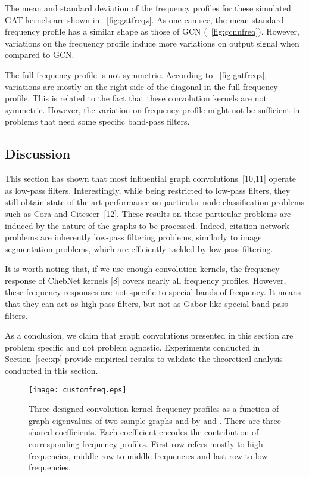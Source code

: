 \documentclass{article}
\begin{document}
The mean and standard deviation of the frequency profiles for these simulated GAT kernels are shown in \figurename~\ref{fig:gatfreqz}. As one can see, the mean standard frequency profile has a similar shape as those of GCN (\figurename~\ref{fig:gcnnfreq}). However, variations on the frequency profile induce more variations on output signal when compared to GCN.  

The full frequency profile is not symmetric. According to  \figurename~\ref{fig:gatfreqz}, variations are mostly on the right side of the diagonal in the full frequency profile. This is related to the fact that these convolution kernels are not symmetric. However, the variation on frequency profile might not be sufficient in problems that need some specific band-pass filters.  


\subsection*{Discussion}

This section has shown that most influential graph convolutions~[10,11] operate as low-pass filters. Interestingly, while being restricted to low-pass filters, they still obtain state-of-the-art performance on particular node classification problems such as Cora and Citeseer~[12]. These results  on these particular problems are induced by the nature of the graphs to be processed. Indeed, citation network problems are inherently low-pass filtering problems, similarly to image segmentation problems, which are efficiently tackled by low-pass filtering. 

It is worth noting that, if we use enough convolution kernels, the frequency response of ChebNet kernels [8] covers nearly all frequency profiles. However, these frequency responses are not specific to special bands of frequency. It means that they can act as high-pass filters, but not as  Gabor-like special band-pass filters.

As a conclusion, we claim that graph convolutions presented in this section are problem specific and not problem agnostic. Experiments conducted in Section~\ref{sec:xp} provide empirical results to validate the theoretical analysis conducted in this section.


\begin{figure}[!t]
  \centering
  \texttt{[image: customfreq.eps]}
  \caption{Three designed convolution kernel frequency profiles as a function of graph eigenvalues  of two sample graphs  and   by  and . There are three shared coefficients. Each coefficient encodes the contribution of corresponding frequency profiles. First row refers mostly to high frequencies, middle row to middle frequencies and last row to low frequencies.}
  \label{fig:spec_design}
\end{figure}
\end{document}
